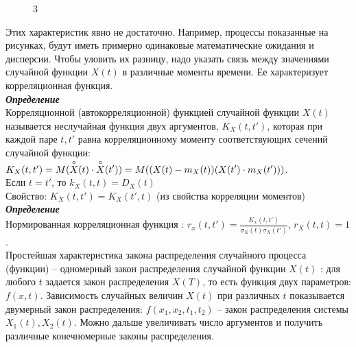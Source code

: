 \documentclass[russian, 12pt, fleqn,x11names]{article}
\begin{document}
\begin{figure}[!h]
\caption{$3$}
\end{figure}
\newpage
\noindent
Этих характеристик явно не достаточно. Например, процессы показанные на рисунках, будут иметь примерно одинаковые математические ожидания и дисперсии. Чтобы уловить их разницу, надо указать связь между значениями случайной функции $X(t)$ в различные моменты времени. Ее характеризует корреляционная функция.\\
\textit{\textbf{Определение}}\\ 
Корреляционной (автокорреляционной) функцией случайной функции $X(t)$ называется неслучайная функция двух аргументов, $K_{X}(t, t') $, которая при каждой паре $t, t'$ равна корреляционному моменту соответствующих сечений случайной функции:$K_X(t, t') = M(  
\displaystyle{\buildrel\circ\over X}(t) 
\cdot 
\displaystyle{\buildrel\circ\over X}(t'))
 = M((X(t) - m_X(t)) (X(t') \cdot  m_X(t') ) ) $.\\
Если $t=t'$, то $k_X(t, t) = D_X(t)$\\
Свойство: $K_X(t, t') = K_X(t', t)$ (из свойства корреляции моментов)\\
\textit{\textbf{Определение}}\\ 
Нормированная корреляционная функция : $r_x(t, t') = \frac{K_x(t, t')}{\sigma_X(t) \sigma_X(t')}$, $r_X(t, t) = 1$.\\
Простейшая характеристика закона распределения случайного процесса (функции) -- одномерный закон  распределения случайной функции $X(t)$ : для любого $t$ задается закон распределения $X(T)$,  то есть функция двух параметров: $f(x, t)$. Зависимость случайных величин $X(t)$ при различных $t$ показывается двумерный закон распределения:  $f(x_1, x_2, t_1, t_2)$ -- закон распределения системы $X_1(t), X_2(t)$. Можно дальше увеличивать число аргументов и получить различные конечномерные законы распределения.
\end{document}

